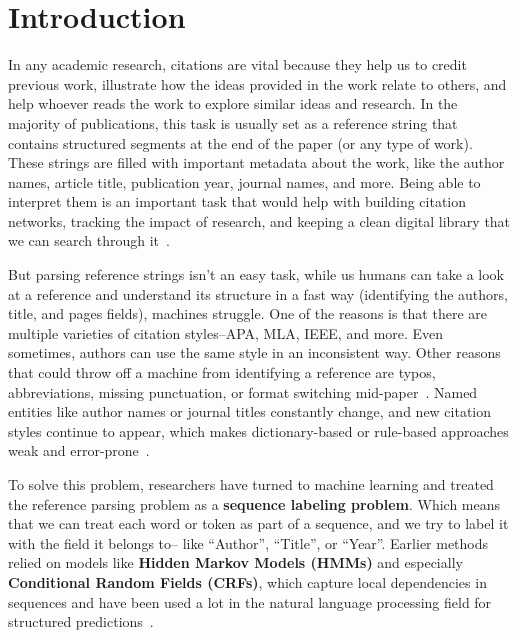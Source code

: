 \chapter{Introduction}
\label{ch:intro}

In any academic research, citations are vital because they help us to credit previous work, illustrate how the ideas provided in the work relate to others, and help whoever reads the work to explore similar ideas and research. In the majority of publications, this task is usually set as a reference string that contains structured segments at the end of the paper (or any type of work). These strings are filled with important metadata about the work, like the author names, article title, publication year, journal names, and more. Being able to interpret them is an important task that would help with building citation networks, tracking the impact of research, and keeping a clean digital library that we can search through it~\cite{councill-etal-2008-parscit,prasad2018neuralparscit}.

But parsing reference strings isn’t an easy task, while us humans can take a look at a reference and understand its structure in a fast way (identifying the authors, title, and pages fields), machines struggle. One of the reasons is that there are multiple varieties of citation styles–APA, MLA, IEEE, and more. Even sometimes, authors can use the same style in an inconsistent way. Other reasons that could throw off a machine from identifying a reference are typos, abbreviations, missing punctuation, or format switching mid-paper~\cite{councill-etal-2008-parscit,prasad2018neuralparscit}. Named entities like author names or journal titles constantly change, and new citation styles continue to appear, which makes dictionary-based or rule-based approaches weak and error-prone~\cite{prasad2018neuralparscit}.

To solve this problem, researchers have turned to machine learning and treated the reference parsing problem as a \textbf{sequence labeling problem}. Which means that we can treat each word or token as part of a sequence, and we try to label it with the field it belongs to– like “Author”, “Title”, or “Year”. Earlier methods relied on models like \textbf{Hidden Markov Models (HMMs)} and especially \textbf{Conditional Random Fields (CRFs)}, which capture local dependencies in sequences and have been used a lot in the natural language processing field for structured predictions~\cite{HMM1165342,crf2001}.

